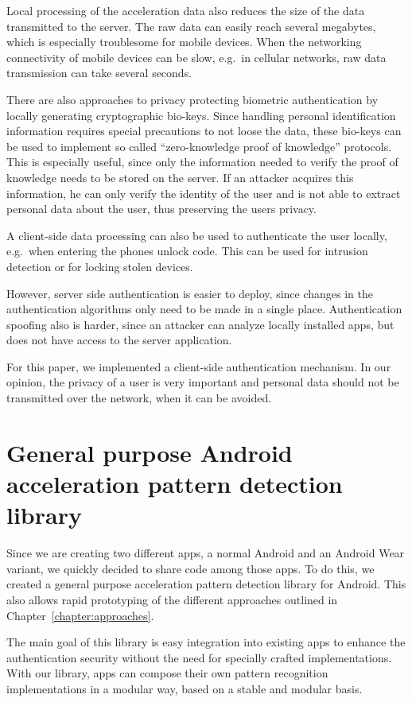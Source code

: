 Local processing of the acceleration data also reduces the size of the data transmitted to the server. The raw data can easily reach several megabytes, which is especially troublesome for mobile devices. When the networking connectivity of mobile devices can be slow, e.g.\ in cellular networks, raw data transmission can take several seconds.

There are also approaches to privacy protecting biometric authentication by locally generating cryptographic bio-keys\cite{bhargav2006privacy, verbitskiy2003reliable, ross2011visual}. Since handling personal identification information requires special precautions to not loose the data, these bio-keys can be used to implement so called ``zero-knowledge proof of knowledge'' protocols. This is especially useful, since only the information needed to verify the proof of knowledge needs to be stored on the server. If an attacker acquires this information, he can only verify the identity of the user and is not able to extract personal data about the user, thus preserving the users privacy.

A client-side data processing can also be used to authenticate the user locally, e.g.\ when entering the phones unlock code. This can be used for intrusion detection or for locking stolen devices.

However, server side authentication is easier to deploy, since changes in the authentication algorithms only need to be made in a single place. Authentication spoofing also is harder, since an attacker can analyze locally installed apps, but does not have access to the server application.

For this paper, we implemented a client-side authentication mechanism. In our opinion, the privacy of a user is very important and personal data should not be transmitted over the network, when it can be avoided.

\section{General purpose Android acceleration pattern detection library}
Since we are creating two different apps, a normal Android and an Android Wear variant, we quickly decided to share code among those apps. To do this, we created a general purpose acceleration pattern detection library for Android. This also allows rapid prototyping of the different approaches outlined in Chapter~\ref{chapter:approaches}.

The main goal of this library is easy integration into existing apps to enhance the authentication security without the need for specially crafted implementations. With our library, apps can compose their own pattern recognition implementations in a modular way, based on a stable and modular basis.

